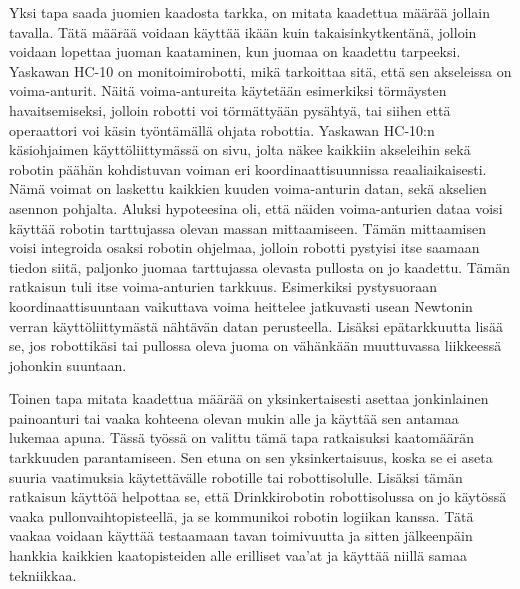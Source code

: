 Yksi tapa saada juomien kaadosta tarkka, on mitata kaadettua määrää jollain tavalla. Tätä määrää voidaan käyttää ikään kuin takaisinkytkentänä, jolloin voidaan lopettaa juoman kaataminen, kun juomaa on kaadettu tarpeeksi. Yaskawan HC-10 on monitoimirobotti, mikä tarkoittaa sitä, että sen akseleissa on voima-anturit. Näitä voima-antureita käytetään esimerkiksi törmäysten havaitsemiseksi, jolloin robotti voi törmättyään pysähtyä, tai siihen että operaattori voi käsin työntämällä ohjata robottia. Yaskawan HC-10:n käsiohjaimen käyttöliittymässä on sivu, jolta näkee kaikkiin akseleihin sekä robotin päähän kohdistuvan voiman eri koordinaattisuunnissa reaaliaikaisesti. Nämä voimat on laskettu kaikkien kuuden voima-anturin datan, sekä akselien asennon pohjalta. \cite[s.10-11]{Yaskawa} Aluksi hypoteesina oli, että näiden voima-anturien dataa voisi käyttää robotin tarttujassa olevan massan mittaamiseen. Tämän mittaamisen voisi integroida osaksi robotin ohjelmaa, jolloin robotti pystyisi itse saamaan tiedon siitä, paljonko juomaa tarttujassa olevasta pullosta on jo kaadettu. Tämän ratkaisun  tuli itse voima-anturien tarkkuus. Esimerkiksi pystysuoraan koordinaattisuuntaan vaikuttava voima heittelee jatkuvasti usean Newtonin verran käyttöliittymästä nähtävän datan perusteella. Lisäksi epätarkkuutta lisää se, jos robottikäsi tai pullossa oleva juoma on vähänkään muuttuvassa liikkeessä johonkin suuntaan.

Toinen tapa mitata kaadettua määrää on yksinkertaisesti asettaa jonkinlainen painoanturi tai vaaka kohteena olevan mukin alle ja käyttää sen antamaa lukemaa apuna. Tässä työssä on valittu tämä tapa ratkaisuksi kaatomäärän tarkkuuden parantamiseen. Sen etuna on sen yksinkertaisuus, koska se ei aseta suuria vaatimuksia käytettävälle robotille tai robottisolulle. Lisäksi tämän ratkaisun käyttöä helpottaa se, että Drinkkirobotin robottisolussa on jo käytössä vaaka pullonvaihtopisteellä, ja se kommunikoi robotin logiikan kanssa. Tätä vaakaa voidaan käyttää testaamaan tavan toimivuutta ja sitten jälkeenpäin hankkia kaikkien kaatopisteiden alle erilliset vaa'at ja käyttää niillä samaa tekniikkaa.

